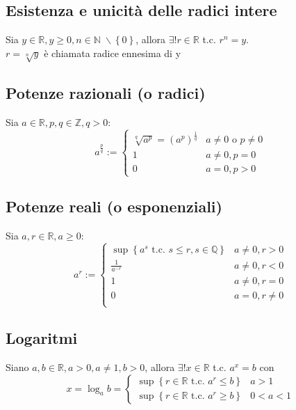 \documentclass[a4paper]{article}
\begin{document}
\subsection{Esistenza e unicità delle radici intere}
Sia \(y \in \mathbb{R}, y \geq 0, n \in \mathbb{N} \; \backslash \left\{ 0 \right\} \), allora \(\exists! r \in \mathbb{R}\) t.c. \(r ^ n = y\).\\
\(r = \sqrt[n]{y} \) è chiamata radice ennesima di y

\subsection{Potenze razionali (o radici)}
Sia \(a \in \mathbb{R}, p, q \in \mathbb{Z}, q > 0\):
\[ a ^ \frac{p}{q} := 
\begin{cases}
	\sqrt[q]{a ^ p} = \left( a ^ p \right) ^ \frac{1}{q} & a \neq 0 \text{ o } p \neq 0 \\
	1 & a \neq 0, p = 0 \\
	0 & a = 0, p > 0
\end{cases}
\]

\subsection{Potenze reali (o esponenziali)}
Sia \(a,r \in \mathbb{R}, a \geq 0\):
\[ a ^ r := 
\begin{cases}
	\sup  \left\{a ^ s \text{ t.c. } s \leq r, s \in \mathbb{Q} \right\} & a \neq 0, r > 0 \\
	\frac{1}{a ^ {-r}} & a \neq 0, r < 0 \\
	1 & a \neq 0, r = 0 \\
	0 & a = 0, r \neq 0 \\
\end{cases}
\]

\subsection{Logaritmi}
Siano \(a,b \in \mathbb{R}, a > 0, a \neq 1, b > 0\), allora \(\exists!  x \in \mathbb{R}\) t.c. \(a ^ x = b\) con
\[ x = \log_a b = 
\begin{cases}
	\sup  \left\{ r \in \mathbb{R} \text{ t.c. } a ^ r \leq b \right\} & a > 1 \\
	\sup  \left\{ r \in \mathbb{R} \text{ t.c. } a ^ r \geq b \right\} & 0 < a < 1
\end{cases}
\]
\end{document}
